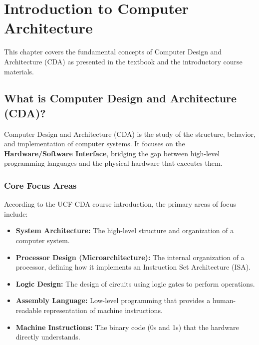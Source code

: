 \chapter{Introduction to Computer Architecture}

This chapter covers the fundamental concepts of Computer Design and Architecture (CDA) as presented in the textbook and the introductory course materials.

\section{What is Computer Design and Architecture (CDA)?}

\begin{definition}
Computer Design and Architecture (CDA) is the study of the structure, behavior, and implementation of computer systems. It focuses on the \textbf{Hardware/Software Interface}, bridging the gap between high-level programming languages and the physical hardware that executes them.
\end{definition}

\subsection{Core Focus Areas}

According to the UCF CDA course introduction, the primary areas of focus include:

\begin{itemize}
    \item \textbf{System Architecture:} The high-level structure and organization of a computer system.
    \item \textbf{Processor Design (Microarchitecture):} The internal organization of a processor, defining how it implements an Instruction Set Architecture (ISA).
    \item \textbf{Logic Design:} The design of circuits using logic gates to perform operations.
    \item \textbf{Assembly Language:} Low-level programming that provides a human-readable representation of machine instructions.
    \item \textbf{Machine Instructions:} The binary code (0s and 1s) that the hardware directly understands.
\end{itemize}

